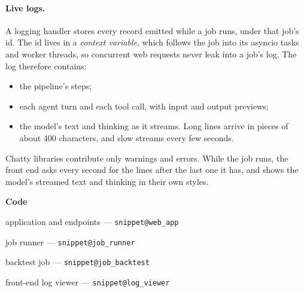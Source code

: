 \documentclass[11pt,a4paper]{article}
\makeatletter
\newcommand{\snippetsource}[1]{\csname snippet@#1\endcsname}
\newcommand{\snippet}[3]{%
  }
\newenvironment{codepointers}{%
  \par\smallskip\begingroup\footnotesize\noindent\textcolor{blue!50!black}{\textbf{Code}}\par\nopagebreak
  \begin{list}{}{\setlength{\leftmargin}{1.2em}\setlength{\itemsep}{0pt}\setlength{\parsep}{0pt}\setlength{\topsep}{1pt}}}%
  {\end{list}\endgroup\smallskip}
\newcommand{\codeitem}[2]{\item #2 --- \texttt{\snippetsource{#1}}}
\makeatother
\begin{document}
\paragraph{Live logs.} A logging handler stores every record emitted while a job runs,
under that job's id. The id lives in a \emph{context variable}, which follows the job into
its asyncio tasks and worker threads, so concurrent web requests never leak into a job's
log. The log therefore contains:
\begin{itemize}
  \item the pipeline's steps;
  \item each agent turn and each tool call, with input and output previews;
  \item the model's text and thinking as it streams. Long lines arrive in pieces of about
        400 characters, and slow streams every few seconds.
\end{itemize}
Chatty libraries contribute only warnings and errors. While the job runs, the front end
asks every second for the lines after the last one it has, and shows the model's streamed
text and thinking in their own styles.
\snippet{job_log_handler}{Python}{Per-job log capture}
\snippet{job_run}{Python}{Running a job with its log context}
\begin{codepointers}
  \codeitem{web_app}{application and endpoints}
  \codeitem{job_runner}{job runner}
  \codeitem{job_backtest}{backtest job}
  \codeitem{log_viewer}{front-end log viewer}
\end{codepointers}
\end{document}
